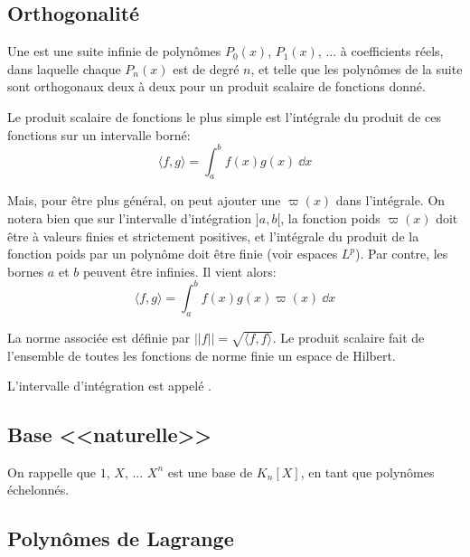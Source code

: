 \medskip
\subsection{Orthogonalité}

Une  est 
une suite infinie de polynômes  $P_0(x)$, $P_1(x)$, ... à coefficients réels, dans laquelle chaque 
$P_n(x)$ est de degré $n$, et telle que les polynômes de la suite sont orthogonaux deux à deux 
pour un produit scalaire de fonctions donné.

\medskip
Le produit scalaire de fonctions le plus simple est l'intégrale du produit de ces fonctions
sur un intervalle borné:
\begin{equation}
    \langle f,g \rangle=\int_a^b f(x)g(x)~\dd x
\end{equation}

\medskip
Mais, pour être plus général, on peut ajouter une  $\varpi(x)$ dans 
l'intégrale.
On notera bien que sur l'intervalle d'intégration $]a,b[$, la fonction poids $\varpi(x)$ doit être à 
valeurs finies et strictement positives, et l'intégrale du produit de la fonction poids par un polynôme 
doit être finie (voir espaces $L^p$).
Par contre, les bornes $a$ et $b$ peuvent être infinies.
Il vient alors:
\begin{equation}
    \langle f,g \rangle=\int_a^b f(x)g(x)\varpi(x)~\dd x
\end{equation}

La norme associée est définie par $||f||=\sqrt{\langle f,f \rangle}$.
Le produit scalaire fait de l'ensemble de toutes les fonctions de norme finie un 
espace de Hilbert.

L'intervalle d'intégration est appelé .




\medskip
\subsection{Base <<naturelle>>}

On rappelle que $1$, $X$, ... $X^n$ est une base de $K_n[X]$, en tant que
polynômes échelonnés.



\medskip
\subsection{Polynômes de Lagrange}

